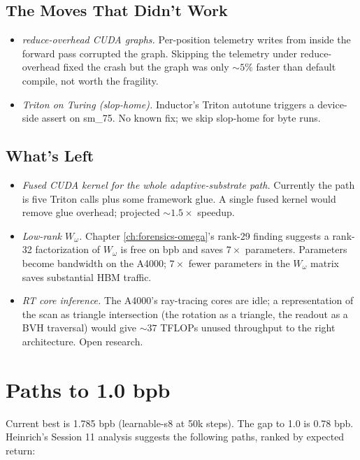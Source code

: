 \documentclass[11pt,openany]{book}
\theoremstyle{definition}
\theoremstyle{plain}
\newcommand{\omegaproj}{W_\omega}
\begin{document}
\section{The Moves That Didn't Work}

\begin{itemize}
  \item \emph{reduce-overhead CUDA graphs.} Per-position telemetry writes
    from inside the forward pass corrupted the graph. Skipping the
    telemetry under reduce-overhead fixed the crash but the graph was
    only $\sim 5\%$ faster than default compile, not worth the
    fragility.
  \item \emph{Triton on Turing (slop-home).} Inductor's Triton autotune
    triggers a device-side assert on sm\_75. No known fix; we skip
    slop-home for byte runs.
\end{itemize}

\section{What's Left}

\begin{itemize}
  \item \emph{Fused CUDA kernel for the whole adaptive-substrate path.}
    Currently the path is five Triton calls plus some framework glue.
    A single fused kernel would remove glue overhead; projected
    $\sim 1.5\times$ speedup.
  \item \emph{Low-rank $\omegaproj$.} Chapter \ref{ch:forensics-omega}'s
    rank-29 finding suggests a rank-32 factorization of $\omegaproj$
    is free on bpb and saves $7\times$ parameters. Parameters become
    bandwidth on the A4000; $7\times$ fewer parameters in the
    $\omegaproj$ matrix saves substantial HBM traffic.
  \item \emph{RT core inference.} The A4000's ray-tracing cores are
    idle; a representation of the scan as triangle intersection (the
    rotation as a triangle, the readout as a BVH traversal) would
    give $\sim 37$ TFLOPs unused throughput to the right architecture.
    Open research.
\end{itemize}

\chapter{Paths to 1.0 bpb}
\label{ch:paths}

Current best is 1.785 bpb (learnable-s8 at 50k steps). The gap to 1.0
is 0.78 bpb. Heinrich's Session 11 analysis suggests the following
paths, ranked by expected return:
\end{document}
